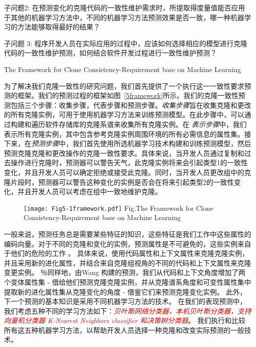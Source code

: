 
子问题2: 在预测变化的克隆代码的一致性维护需求时，所提取得度量值能否应用于其他的机器学习方法中，不同的机器学习方法预测效果是否一致，哪一种机器学习的方法能够取得最好的结果？


子问题 3: 程序开发人员在实际应用的过程中，应该如何选择相应的模型进行克隆代码的一致性维护预测，如何结合软件开发过程进行一致性维护预测？

{The Framework for Clone Consistency-Requirement base on Machine Learning}

为了解决我们克隆一致性的研究问题，我们首先提供了一个执行这一一致性要求预测的框架。我们的预测过程的框架如图~\ref{5framework}所示。我们的克隆一致性预测包括三个步骤：收集步骤，代表步骤和预测步骤。{\em 收集步骤\/}旨在收集克隆和更改的所有克隆实例，可用于使用机器学习方法来训练预测模型。在此步骤中，可以通过构建和遍历软件存储库的克隆系谱来收集所有克隆实例。在\emph{ 表示步骤\/}中，我们表示所有克隆实例，其中包含参考克隆实例周围环境的所有必需信息的属性集。接下来，在{\em 预测步骤\/}中，我们首先使用所选机器学习技术构建和训练预测模型，然后预测克隆克隆和更改操作的克隆一致性要求。具体来说，当开发人员通过复制和过去操作进行克隆时，预测器可以警告天气，此克隆实例将来会引起类型1的一致性变化，并且开发人员可以确定拒绝或接受此克隆。同时，当开发人员更改组中的克隆片段时，预测器可以警告这种变化的实例是否会在将来引起类型2的一致性变化，并且开发人员可以考虑在组中一致地维护克隆。

\begin{figure}[htbp]
\centering
\texttt{[image: Fig5-1framework.pdf]}
{Fig.$\!$}{The Framework for Clone Consistency-Requirement base on Machine Learning}
\vspace{-1em}
\end{figure}

一般来说，预测任务总是需要某些特征的知识，这些特征是我们工作中这些属性的编码向量。对于不同的克隆和变化的实例，预测属性是不可避免的，这些实例来自于他们的危险的工作\cite{wang2014predicting} \cite{zhang2016predicting}。
具体来说，使用代码属性和上下文属性来克隆克隆实例，并且采用新的进化属性，并结合来自克隆组视角的不同的代码和上下文属性来克隆变更实例。
％同样地，由Wang 构建的预测，我们从代码和上下文角度增加了两个变体属性集 - 借给他们预测克隆克隆实例，并从克隆谱系角度和可变性属性集中提取新的进化属性集从克隆变化的角度 - 借鉴它们来预测克隆变化实例。
此外，下一个预测的基本知识是采用不同机器学习方法的技术。
在我们的表现预测中，我们考虑五种不同的学习方法如下：\textcolor{red}{\em 贝叶斯网络分类器\cite{friedman1997bayesian}，本机贝叶斯分类器\cite{john1995estimating}，支持向量机分类器\cite{platt199912} K-Nearest Neighbors classifier \cite{aha1991instance}和决策树分类器\cite{quinlan2014c4}}。
我们执行和比较所有这五种机器学习方法，以帮助开发人员选择一种克隆和改变实际预测的一般技术。


